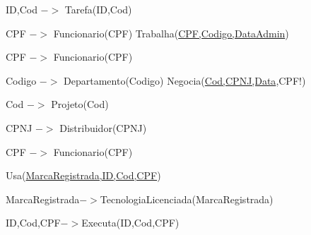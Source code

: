 \documentclass{article}
\begin{document}
\hspace{2cm}ID,Cod $->$ Tarefa(ID,Cod)


\hspace{2cm}CPF $->$ Funcionario(CPF)
\newline\newline
Trabalha(\underline{CPF,Codigo,DataAdmin})

\hspace{2cm}CPF $->$ Funcionario(CPF)

\hspace{2cm}Codigo $->$ Departamento(Codigo)
\newline\newline
Negocia(\underline{Cod,CPNJ,Data},CPF!)

\hspace{2cm}Cod $->$ Projeto(Cod)

\hspace{2cm}CPNJ $->$ Distribuidor(CPNJ)

\hspace{2cm}CPF $->$ Funcionario(CPF)
\newline\newline

Usa(\underline{MarcaRegistrada,ID,Cod,CPF})

\hspace{2cm}MarcaRegistrada$->$TecnologiaLicenciada(MarcaRegistrada)

\hspace{2cm}ID,Cod,CPF$->$Executa(ID,Cod,CPF)
\end{document}
